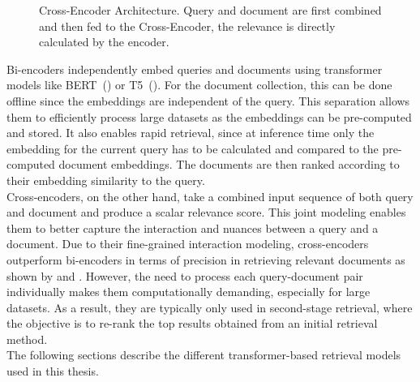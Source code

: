 \begin{figure}[tb]
\begin{minipage}{.48\textwidth}
    \caption{Cross-Encoder Architecture. Query and document are first combined and then fed to the Cross-Encoder, the relevance is directly calculated by the encoder.}
    \label{fig:cross-encoder}
  \end{minipage}
\end{figure}
Bi-encoders independently embed queries and documents using transformer models like BERT~(\cite{devlin:2018:BERT}) or T5~(\cite{roberts:2019:Exploring}).
For the document collection, this can be done offline since the embeddings are independent of the query.
This separation allows them to efficiently process large datasets as the embeddings can be pre-computed and stored.
It also enables rapid retrieval, since at inference time only the embedding for the current query has to be calculated and compared to the pre-computed document embeddings.
The documents are then ranked according to their embedding similarity to the query.
\\
Cross-encoders, on the other hand, take a combined input sequence of both query and document and produce a scalar relevance score.
This joint modeling enables them to better capture the interaction and nuances between a query and a document.
Due to their fine-grained interaction modeling, cross-encoders outperform bi-encoders in terms of precision in retrieving relevant documents as shown by \cite{thakur:2020:Augmented} and \cite{rosa:2022:In}.
However, the need to process each query-document pair individually makes them computationally demanding, especially for large datasets.
As a result, they are typically only used in second-stage retrieval, where the objective is to re-rank the top results obtained from an initial retrieval method.
\\
The following sections describe the different transformer-based retrieval models used in this thesis.
